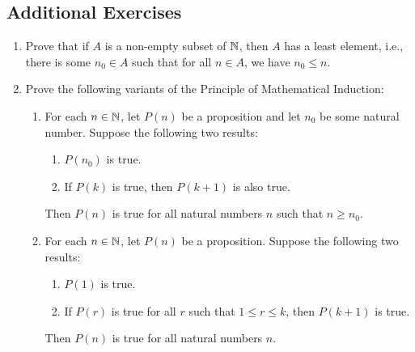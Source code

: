 \documentclass[../main.tex]{subfiles}
\begin{document}
\subsection*{Additional Exercises}
\begin{enumerate}[ref={\thechapter.\arabic*}]
    \item \label{axr:0.1}Prove that if $A$ is a non-empty subset of $\mathbb{N}$, then $A$ has a least element, i.e., there is some $n_0\in A$ such that for all $n\in A$, we have $n_0\leq n$.
    \item \label{axr:0.2}Prove the following variants of the Principle of Mathematical Induction:
    \begin{enumerate}
        \item \label{axr:0.2a}For each $n\in\mathbb{N}$, let $P(n)$ be a proposition and let $n_0$ be some natural number. Suppose the following two results:
        \begin{center}
            \begin{minipage}[c]{0.47\linewidth}
                \begin{enumerate}[label={(\Alph*)},parsep=0pt]
                    \item $P(n_0)$ is true.
                    \item If $P(k)$ is true, then $P(k+1)$ is also true.
                \end{enumerate}
            \end{minipage}
        \end{center}
        Then $P(n)$ is true for all natural numbers $n$ such that $n\geq n_0$.
        \item \label{axr:0.2b}For each $n\in\mathbb{N}$, let $P(n)$ be a proposition. Suppose the following two results:
        \begin{center}
            \begin{minipage}[c]{0.73\linewidth}
                \begin{enumerate}[label={(\Alph*)},parsep=0pt]
                    \item $P(1)$ is true.
                    \item If $P(r)$ is true for all $r$ such that $1\leq r\leq k$, then $P(k+1)$ is true.
                \end{enumerate}
            \end{minipage}
        \end{center}
        Then $P(n)$ is true for all natural numbers $n$.
    \end{enumerate}
    \setcounter{enumi}{6}

\end{enumerate}
\end{document}
